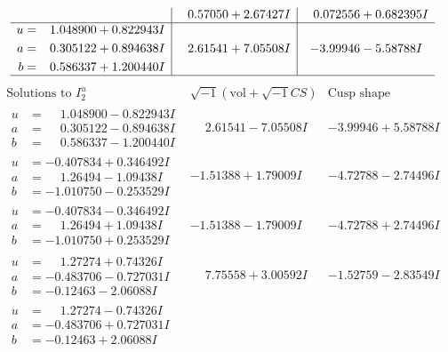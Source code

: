 \documentclass[1p]{elsarticle_modified}
\theoremstyle{definition}
\newcommand{\I}{\sqrt{-1}}
\begin{document}
$$\begin{array}{c|c|c}
 & \phantom{-}0.57050 + 2.67427 I & \phantom{-}0.072556 + 0.682395 I \\ \hline\begin{aligned}
u &= \phantom{-}1.048900 + 0.822943 I \\
a &= \phantom{-}0.305122 + 0.894638 I \\
b &= \phantom{-}0.586337 + 1.200440 I\end{aligned}
 & \phantom{-}2.61541 + 7.05508 I & -3.99946 - 5.58788 I\\
 \hline 
 \end{array}$$\newpage$$\begin{array}{c|c|c}  
\text{Solutions to }I^u_{2}& \I (\text{vol} + \sqrt{-1}CS) & \text{Cusp shape}\\
 \hline 
\begin{aligned}
u &= \phantom{-}1.048900 - 0.822943 I \\
a &= \phantom{-}0.305122 - 0.894638 I \\
b &= \phantom{-}0.586337 - 1.200440 I\end{aligned}
 & \phantom{-}2.61541 - 7.05508 I & -3.99946 + 5.58788 I \\ \hline\begin{aligned}
u &= -0.407834 + 0.346492 I \\
a &= \phantom{-}1.26494 - 1.09438 I \\
b &= -1.010750 - 0.253529 I\end{aligned}
 & -1.51388 + 1.79009 I & -4.72788 - 2.74496 I \\ \hline\begin{aligned}
u &= -0.407834 - 0.346492 I \\
a &= \phantom{-}1.26494 + 1.09438 I \\
b &= -1.010750 + 0.253529 I\end{aligned}
 & -1.51388 - 1.79009 I & -4.72788 + 2.74496 I \\ \hline\begin{aligned}
u &= \phantom{-}1.27274 + 0.74326 I \\
a &= -0.483706 - 0.727031 I \\
b &= -0.12463 - 2.06088 I\end{aligned}
 & \phantom{-}7.75558 + 3.00592 I & -1.52759 - 2.83549 I \\ \hline\begin{aligned}
u &= \phantom{-}1.27274 - 0.74326 I \\
a &= -0.483706 + 0.727031 I \\
b &= -0.12463 + 2.06088 I\end{aligned}

\end{array}$$
\end{document}

